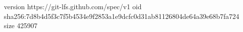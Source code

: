 version https://git-lfs.github.com/spec/v1
oid sha256:7d8b4d5f3c7f5b4534e9f2853a1e9dcfc0d31ab81126804de64a39e68b7fa724
size 425907
